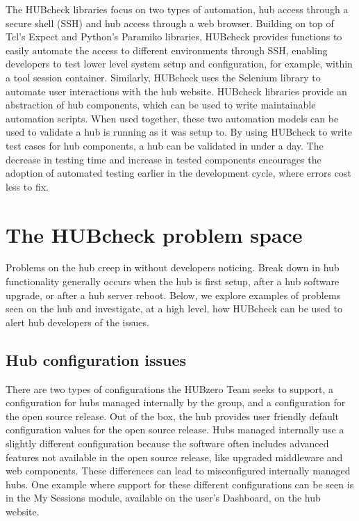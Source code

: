 \documentclass[letterpaper]{scrartcl}
\begin{document}
The HUBcheck libraries focus on two types of automation, hub access through a
secure shell (SSH) and hub access through a web browser. Building on top of
Tcl's Expect and Python's Paramiko libraries, HUBcheck provides functions to
easily automate the access to different environments through SSH, enabling
developers to test lower level system setup and configuration, for example,
within a tool session container. Similarly, HUBcheck uses the Selenium library
to automate user interactions with the hub website.  HUBcheck libraries provide
an abstraction of hub components, which can be used to write maintainable
automation scripts. When used together, these two automation models can be used
to validate a hub is running as it was setup to.  By using HUBcheck to write
test cases for hub components, a hub can be validated in under a day. The
decrease in testing time and increase in tested components encourages the
adoption of automated testing earlier in the development cycle, where errors
cost less to fix.


\section{The HUBcheck problem space}

Problems on the hub creep in without developers noticing. Break down in hub
functionality generally occurs when the hub is first setup, after a hub
software upgrade, or after a hub server reboot.  Below, we explore examples of
problems seen on the hub and investigate, at a high level, how HUBcheck can be
used to alert hub developers of the issues.


\subsection{Hub configuration issues}

There are two types of configurations the HUBzero Team seeks to
support, a configuration for hubs managed internally by the group, and a
configuration for the open source release. Out of the box, the hub provides
user friendly default configuration values for the open source release. Hubs
managed internally use a slightly different configuration because the software
often includes advanced features not available in the open source release, like
upgraded middleware and web components. These differences can lead to
misconfigured internally managed hubs. One example where support for these
different configurations can be seen is in the My Sessions module, available on
the user's Dashboard, on the hub website.
\end{document}
